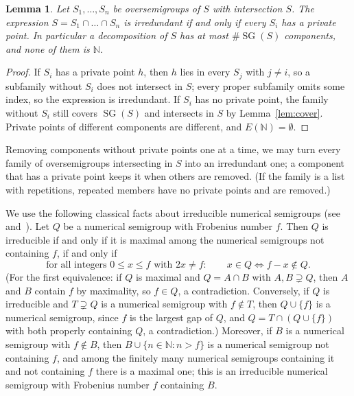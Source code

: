 \documentclass[11pt]{article}
\newtheorem{lemma}{Lemma}
\theoremstyle{definition}
\theoremstyle{remark}
\newcommand{\N}{\mathbb N}
\DeclareMathOperator{\SG}{SG}
\begin{document}
\begin{lemma}\label{lem:private}
Let $S_1,\dots,S_n$ be oversemigroups of $S$ with intersection $S$. The
expression $S=S_1\cap\dots\cap S_n$ is irredundant if and only if every $S_i$
has a private point. In particular a decomposition of $S$ has at most
$\#\SG(S)$ components, and none of them is $\N$.
\end{lemma}

\begin{proof}
If $S_i$ has a private point $h$, then $h$ lies in every $S_j$ with $j\ne i$,
so a subfamily without $S_i$ does not intersect in $S$; every proper
subfamily omits some index, so the expression is irredundant. If $S_i$ has no
private point, the family without $S_i$ still covers $\SG(S)$ and intersects
in $S$ by Lemma~\ref{lem:cover}. Private points of different components are
different, and $E(\N)=\emptyset$.
\end{proof}

Removing components without private points one at a time, we may turn every
family of oversemigroups intersecting in $S$ into an irredundant one; a
component that has a private point keeps it when others are removed. (If the
family is a list with repetitions, repeated members have no private points
and are removed.)

We use the following classical facts about irreducible numerical semigroups
(see~\cite[Chapter~3, Theorem~4.2 and Proposition~4.4]{rg}
and~\cite[Section~1]{go}). Let $Q$ be a numerical
semigroup with Frobenius number $f$. Then $Q$ is irreducible if and only if
it is maximal among the numerical semigroups not containing $f$, if and only
if
\begin{equation}\label{eq:sym}
\text{for all integers }0\le x\le f\text{ with }2x\ne f:\qquad
x\in Q\iff f-x\notin Q .
\end{equation}
(For the first equivalence: if $Q$ is maximal and $Q=A\cap B$ with
$A,B\supsetneq Q$, then $A$ and $B$ contain $f$ by maximality, so $f\in Q$, a
contradiction. Conversely, if $Q$ is irreducible and $T\supsetneq Q$ is a
numerical semigroup with $f\notin T$, then $Q\cup\{f\}$ is a numerical
semigroup, since $f$ is the largest gap of $Q$, and $Q=T\cap(Q\cup\{f\})$ with
both properly containing $Q$, a contradiction.) Moreover, if $B$ is a numerical
semigroup with $f\notin B$, then $B\cup\{n\in\N:n>f\}$ is a numerical
semigroup not containing $f$, and among the finitely many numerical semigroups
containing it and not containing $f$ there is a maximal one; this is an
irreducible numerical semigroup with Frobenius number $f$ containing $B$.
\end{document}
